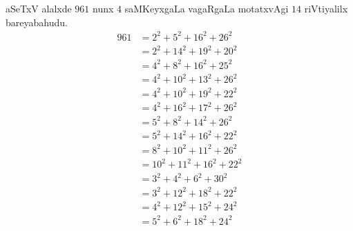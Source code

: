 aSeTxV alalxde $961$ nunx $4$ saMKeyxgaLa vagaRgaLa motatxvAgi $14$ riVtiyalilx bareyabahudu.
\begin{align*}
961 &= 2^2+5^2+16^2+26^2\\
    &= 2^2+14^2+19^2+20^2\\
    &= 4^2+8^2+16^2+25^2\\
    &= 4^2+10^2+13^2+26^2\\
    &= 4^2+10^2+19^2+22^2\\
    &= 4^2+16^2+17^2+26^2\\
    &= 5^2+8^2+14^2+26^2\\
    &= 5^2+14^2+16^2+22^2\\
    &= 8^2+10^2+11^2+26^2\\
    &= 10^2+11^2+16^2+22^2\\
    &= 3^2+4^2+6^2+30^2\\
    &= 3^2+12^2+18^2+22^2\\
    &= 4^2+12^2+15^2+24^2\\
    &= 5^2+6^2+18^2+24^2
\end{align*}

